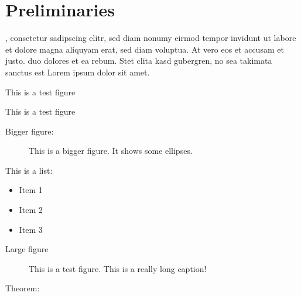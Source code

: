\setcounter{chapter}{-1}
\chapter{Preliminaries}

\lipsum[1-10]

, consetetur sadipscing elitr, sed diam nonumy eirmod
tempor invidunt ut labore et dolore magna aliquyam  erat, sed diam voluptua. At
vero eos et accusam et justo.
duo dolores et ea rebum. Stet clita kasd gubergren,
no sea takimata sanctus est Lorem ipsum dolor sit amet.

\begin{marginfigure}
    \centering
    \caption{This is a test figure}
    \label{fig:test-figure}
\end{marginfigure}

\lipsum[1-5]

\begin{marginfigure}
    \centering
    \caption{This is a test figure}
    \label{fig:test-figure}
\end{marginfigure}


\lipsum[6-10]

Bigger figure:


\begin{SCfigure}[b]
    \caption{This is a bigger figure. It shows some ellipses.}
    \label{fig:bigger-figure}
\end{SCfigure}
\lipsum[1-10]

This is a list:

\begin{itemize}
    \item Item 1
    \item Item 2
    \item Item 3
\end{itemize}

Large figure
\begin{figure*}
    \centering
    \caption{This is a test figure. This is a really long caption!}
    \label{fig:test2-figure}
\end{figure*}

Theorem: 

\begin{theorem}
    \lipsum[60]
\end{theorem}

